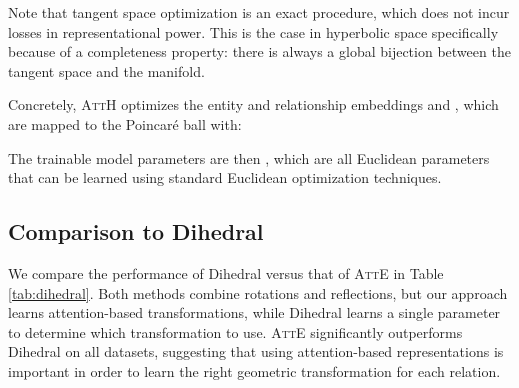 \documentclass[11pt,a4paper]{article}
\newcommand{\model}[1]{\textsc{AttH}}
\begin{document}
Note that tangent space optimization is an exact procedure, which does not incur losses in representational power. 
This is the case in hyperbolic space specifically because of a completeness property: there is always a global bijection between the tangent space and the manifold.  

Concretely, \model{} optimizes the entity and relationship embeddings  and , which are mapped to the Poincar\'e ball with:

The trainable model parameters are then , which are all Euclidean parameters that can be learned using standard Euclidean optimization techniques.  \subsection{Comparison to Dihedral}
We compare the performance of Dihedral \cite{xu2019relation} versus that of \textsc{AttE} in Table \ref{tab:dihedral}. 
Both methods combine rotations and reflections, but our approach learns attention-based transformations, while Dihedral learns a single parameter to determine which transformation to use. 
\textsc{AttE} significantly outperforms Dihedral on all datasets, suggesting that using attention-based representations is important in order to learn the right geometric transformation for each relation. 
\end{document}
